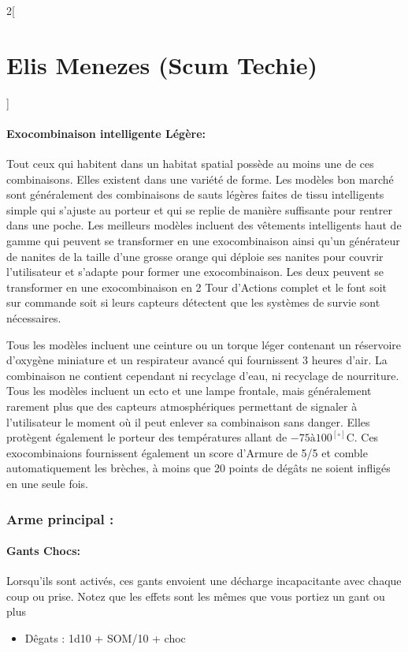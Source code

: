\documentclass[a4paper,9pt]{article}
\begin{document}
\begin{multicols}{2}[\section*{Elis Menezes (Scum Techie)}]
   \paragraph{Exocombinaison intelligente Légère:} Tout ceux qui habitent dans un habitat
   spatial possède au moins une de ces combinaisons. Elles existent dans une
   variété de forme. Les modèles bon marché sont généralement des combinaisons de
   sauts légères faites de tissu intelligents simple qui s'ajuste au porteur et qui
   se replie de manière suffisante pour rentrer dans une poche. Les
   meilleurs modèles incluent des vêtements intelligents haut de gamme qui peuvent
   se transformer en une exocombinaison ainsi qu'un générateur de nanites de la
   taille d'une grosse orange qui déploie ses nanites pour couvrir l'utilisateur
   et s'adapte pour former une exocombinaison. Les deux peuvent se transformer en
   une exocombinaison en 2 Tour d'Actions complet et le font soit sur commande soit
   si leurs capteurs détectent que les systèmes de survie sont nécessaires. 

   Tous les modèles incluent une ceinture ou un torque léger contenant un
   réservoire d'oxygène miniature et un respirateur avancé qui fournissent 3
   heures d'air. La combinaison ne contient cependant ni recyclage d'eau, ni
   recyclage de nourriture. Tous les modèles incluent un ecto et une
   lampe frontale, mais généralement rarement plus que des capteurs atmosphériques
   permettant de signaler à l'utilisateur le moment où il peut enlever sa
   combinaison sans danger. Elles protègent également le porteur des températures
   allant de $-75 à 100^[\circ]$C. Ces exocombinaions fournissent également un
   score d'Armure de 5/5 et comble automatiquement les brèches, à moins que 20
   points de dégâts ne soient infligés en une seule fois.

   \subsubsection*{Arme principal :}

   \paragraph{Gants Chocs:} Lorsqu'ils sont activés, ces gants envoient une décharge
   incapacitante avec chaque coup ou prise. Notez que les effets sont les mêmes
   que vous portiez un gant ou plus

   \begin{itemize}
      \item Dêgats : 1d10 + SOM/10 + choc
   \end{itemize}


\end{multicols}
\end{document}
